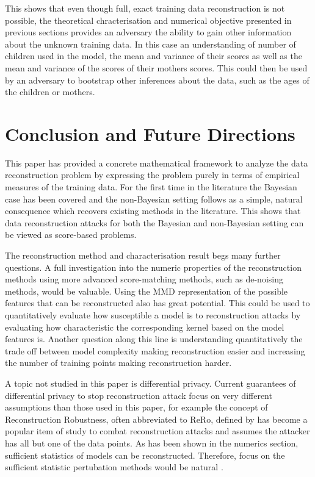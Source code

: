 \documentclass[hyperref]{article}
\theoremstyle{plain}
\theoremstyle{remark}
\begin{document}
This shows that even though full, exact training data reconstruction is not possible, the theoretical chracterisation and numerical objective presented in previous sections provides an adversary the ability to gain other information about the unknown training data. In this case an understanding of number of children used in the model, the mean and variance of their scores as well as the mean and variance of the scores of their mothers scores. This could then be used by an adversary to bootstrap other inferences about the data, such as the ages of the children or mothers. 


\section{Conclusion and Future Directions}\label{sec:conclusion}
This paper has provided a concrete mathematical framework to analyze the data reconstruction problem by expressing the problem purely in terms of empirical measures of the training data. For the first time in the literature the Bayesian case has been covered and the non-Bayesian setting follows as a simple, natural consequence which recovers existing methods in the literature. This shows that data reconstruction attacks for both the Bayesian and non-Bayesian setting can be viewed as score-based problems. 

The reconstruction method and characterisation result begs many further questions. A full investigation into the numeric properties of the reconstruction methods using more advanced score-matching methods, such as de-noising methods, would be valuable. Using the MMD representation of the possible features that can be reconstructed also has great potential. This could be used to quantitatively evaluate how susceptible a model is to reconstruction attacks by evaluating how characteristic the corresponding kernel based on the model features is. Another question along this line is understanding quantitatively the trade off between model complexity making reconstruction easier and increasing the number of training points making reconstruction harder. 

A topic not studied in this paper is differential privacy. Current guarantees of differential privacy to stop reconstruction attack focus on very different assumptions than those used in this paper, for example the concept of Reconstruction Robustness, often abbreviated to ReRo, defined by \citet{Balle2022_informed} has become a popular item of study to combat reconstruction attacks and assumes the attacker has all but one of the data points. As has been shown in the numerics section, sufficient statistics of models can be reconstructed. Therefore, focus on the sufficient statistic pertubation methods would be natural \citep{Bernstein2019,Alabi2022}. 
\end{document}
